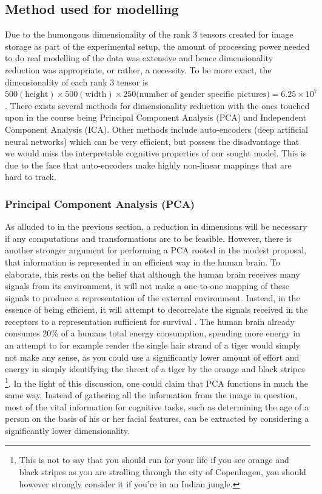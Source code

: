 \subsection{Method used for modelling}
Due to the humongous dimensionality of the rank 3 tensors created for image storage as part of the experimental setup, the amount of processing power needed to do real modelling of the data was extensive and hence dimensionality reduction was appropriate, or rather, a necessity. To be more exact, the dimensionality of each rank 3 tensor is $500 \mathrm{(height)} \times 500 \mathrm{(width)} \times 250 \text{(number of gender specific pictures)}= 6.25 \times 10^{7}$. There exists several methods for dimensionality reduction with the ones touched upon in the course being Principal Component Analysis (PCA) and Independent Component Analysis (ICA). Other methods include auto-encoders (deep artificial neural networks) which can be very efficient, but possess the disadvantage that we would miss the interpretable cognitive properties of our sought model. This is due to the face that auto-encoders make highly non-linear mappings that are hard to track.

\subsubsection{Principal Component Analysis (PCA)}
As alluded to in the previous section, a reduction in dimensions will be necessary if any computations and transformations are to be feasible. However, there is another stronger argument for performing a PCA rooted in the modest proposal, that information is represented in an efficient way in the human brain. To elaborate, this rests on the belief that although the human brain receives many signals from its environment, it will not make a one-to-one mapping of these signals to produce a representation of the external environment. Instead, in the essence of being efficient, it will attempt to decorrelate the signals received in the receptors to a representation sufficient for survival \cite{PCA1}. The human brain already consumes 20\% of a humans total energy consumption, spending more energy in an attempt to for example render the single hair strand of a tiger would simply not make any sense, as you could use a significantly lower amount of effort and energy in simply identifying the threat of a tiger by the orange and black stripes \footnote{This is not to say that you should run for your life if you see orange and black stripes as you are strolling through the city of Copenhagen, you should however strongly consider it if you're in an Indian jungle.}. In the light of this discussion, one could claim that PCA functions in much the same way. Instead of gathering all the information from the image in question, most of the vital information for cognitive tasks, such as determining the age of a person on the basis of his or her facial features, can be extracted by considering a significantly lower dimensionality. 

